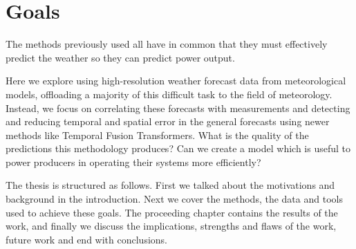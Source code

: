 \section{Goals}
The methods previously used all have in common that they must effectively predict the weather so they can predict power output.


Here we explore using high-resolution weather forecast data from meteorological models, offloading a majority of this difficult task to the field of meteorology. Instead, we focus on correlating these forecasts with measurements and detecting and reducing temporal and spatial error in the general forecasts using newer methods like Temporal Fusion Transformers.
What is the quality of the predictions this methodology produces? Can we create a model which is useful to power producers in operating their systems more efficiently?


The thesis is structured as follows. First we talked about the motivations and background in the introduction. Next we cover the methods, the data and tools used to achieve these goals. The proceeding chapter contains the results of the work, and finally we discuss the implications, strengths and flaws of the work, future work and end with conclusions.







